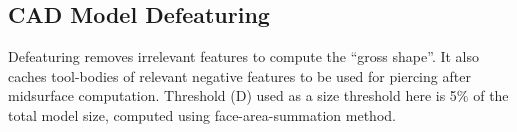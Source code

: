 



\subsection{CAD Model Defeaturing}

Defeaturing removes irrelevant features to compute the ``gross shape''. It also caches tool-bodies of relevant negative features to be used for piercing after midsurface computation. Threshold (D) used as a size threshold here is 5\% of the total model size, computed using face-area-summation method.



